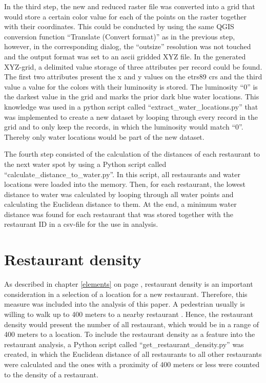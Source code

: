 \documentclass[a4paper, 11pt, oneside]{Thesis}  %
\begin{document}
In the third step, the new and reduced raster file was converted into a grid that would store a certain color value for each of the points on the raster together with their coordinates. This could be conducted by using the same QGIS conversion function ``Translate (Convert format)'' as in the previous step, however, in the corresponding dialog, the ``outsize'' resolution was not touched and the output format was set to an \ac{ascii} gridded XYZ file. In the generated XYZ-grid, a delimited value storage of three attributes per record could be found. The first two attributes present the x and y values on the \ac{etrs89} \ac{crs} and the third value a value for the colors with their luminosity is stored. The luminosity ``0'' is the darkest value in the grid and marks the prior dark blue water locations. This knowledge was used in a python script called ``extract\_water\_locations.py'' that was implemented to create a new dataset by looping through every record in the grid and to only keep the records, in which the luminosity would match ``0''. Thereby only water locations would be part of the new dataset.

The fourth step consisted of the calculation of the distances of each restaurant to the next water spot by using a Python script called ``calculate\_distance\_to\_water.py''. In this script, all restaurants and water locations were loaded into the memory. Then, for each restaurant, the lowest distance to water was calculated by looping through all water points and calculating the Euclidean distance to them. At the end, a minimum water distance was found for each restaurant that was stored together with the restaurant ID in a \ac{csv}-file for the use in analysis.

\section{Restaurant density}
\label{restaurant_density}

As described in chapter \ref{elements} on page \pageref{elements}, restaurant density is an important consideration in a selection of a location for a new restaurant. Therefore, this measure was included into the analysis of this paper. A pedestrian usually is willing to walk up to 400 meters to a nearby restaurant \cite{Yang.2012b}. Hence, the restaurant density would present the number of all restaurant, which would be in a range of 400 meters to a location. To include the restaurant density as a feature into the restaurant analysis, a Python script called ``get\_restaurant\_density.py'' was created, in which the Euclidean distance of all  restaurants to all other restaurants were calculated and the ones with a proximity of 400 meters or less were counted to the density of a restaurant.
\end{document}
